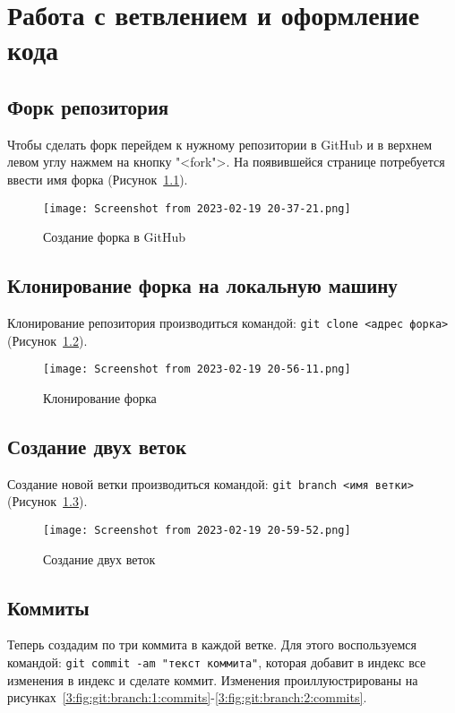 \graphicspath{{~/Documents/SADT/FirstTask/BaCD}}
\chapter{Работа с ветвлением и оформление кода}

\section{Форк репозитория}

Чтобы сделать форк перейдем к нужному репозитории в GitHub и в верхнем левом
углу нажмем на кнопку "<fork">. На появившейся странице потребуется
ввести имя форка (Рисунок~\ref{3:fig:GitHub:fork}).

\begin{figure}[h!tp]
	\centering
	\texttt{[image: Screenshot from 2023-02-19 20-37-21.png]}
	\caption{Создание форка в GitHub}
	\label{3:fig:GitHub:fork}
\end{figure}

\section{Клонирование форка на локальную машину}

Клонирование репозитория производиться командой:
\texttt{git~clone~<адрес~форка>} (Рисунок~\ref{3:fig:git:fork:clone}).

\begin{figure}[h!tp]
	\centering
	\texttt{[image: Screenshot from 2023-02-19 20-56-11.png]}
	\caption{Клонирование форка}
	\label{3:fig:git:fork:clone}
\end{figure}

\section{Создание двух веток}

Создание новой ветки производиться командой:
\texttt{git~branch~<имя~ветки>} (Рисунок~\ref{3:fig:git:branch}).

\begin{figure}[h!tp]
	\centering
	\texttt{[image: Screenshot from 2023-02-19 20-59-52.png]}
	\caption{Создание двух веток}
	\label{3:fig:git:branch}
\end{figure}

\section{Коммиты}
Теперь создадим по три коммита в каждой ветке. Для этого воспользуемся
командой: \texttt{git commit -am "текст коммита"}, которая добавит в индекс
все изменения в индекс и сделате коммит. Изменения проиллуюстрированы
на рисунках~\ref{3:fig:git:branch:1:commits}-\ref{3:fig:git:branch:2:commits}.

